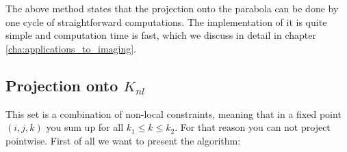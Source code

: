 
        The above method states that the projection onto the parabola can be done by one cycle of straightforward computations. The implementation of it is quite simple and computation time is fast, which we discuss in detail in chapter \ref{cha:applications_to_imaging}.%

    \subsection{Projection onto $K_{nl}$}

        This set is a combination of non-local constraints, meaning that in a fixed point $(i, j, k)$ you sum up for all $k_{1} \le k \le k_{2}$. For that reason you can not project pointwise. First of all we want to present the algorithm:

